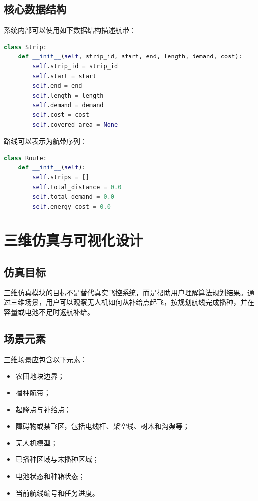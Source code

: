 \documentclass[UTF8,a4paper,12pt]{ctexart}
\begin{document}
\subsection{核心数据结构}

系统内部可以使用如下数据结构描述航带：

\begin{lstlisting}[language=Python, caption={航带数据结构示例}]
class Strip:
    def __init__(self, strip_id, start, end, length, demand, cost):
        self.strip_id = strip_id
        self.start = start
        self.end = end
        self.length = length
        self.demand = demand
        self.cost = cost
        self.covered_area = None
\end{lstlisting}

路线可以表示为航带序列：

\begin{lstlisting}[language=Python, caption={路线数据结构示例}]
class Route:
    def __init__(self):
        self.strips = []
        self.total_distance = 0.0
        self.total_demand = 0.0
        self.energy_cost = 0.0
\end{lstlisting}

\section{三维仿真与可视化设计}

\subsection{仿真目标}

三维仿真模块的目标不是替代真实飞控系统，而是帮助用户理解算法规划结果。通过三维场景，用户可以观察无人机如何从补给点起飞，按规划航线完成播种，并在容量或电池不足时返航补给。

\subsection{场景元素}

三维场景应包含以下元素：

\begin{itemize}
    \item 农田地块边界；
    \item 播种航带；
    \item 起降点与补给点；
    \item 障碍物或禁飞区，包括电线杆、架空线、树木和沟渠等；
    \item 无人机模型；
    \item 已播种区域与未播种区域；
    \item 电池状态和种箱状态；
    \item 当前航线编号和任务进度。
\end{itemize}
\end{document}
